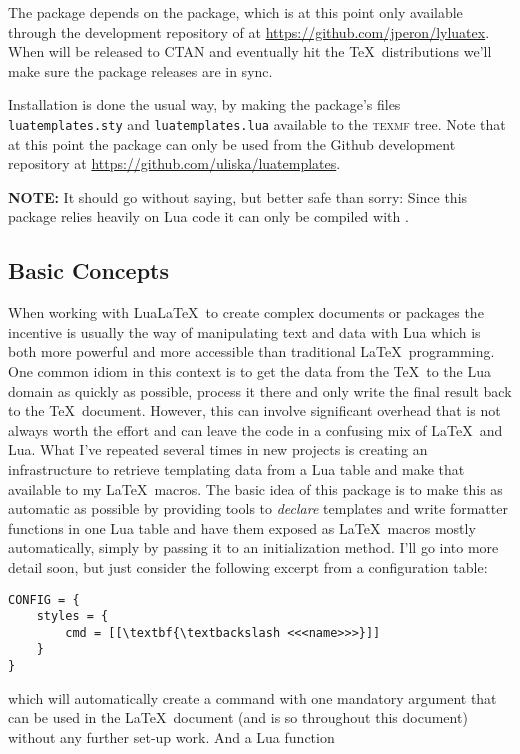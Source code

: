\documentclass{scrartcl}
\begin{document}
The package depends on the  package, which is at this
point only available through the development repository of  at
\url{https://github.com/jperon/lyluatex}.  When  will be
released to CTAN and eventually hit the \TeX\ distributions we'll make sure the
package releases are in sync.

Installation is done the usual way, by making the package's files
\texttt{luatemplates.sty} and \texttt{luatemplates.lua} available to the
\textsc{texmf} tree. Note that at this point the package can only be used from
the Github development repository at
\url{https://github.com/uliska/luatemplates}.

\textbf{NOTE:} It should go without saying, but better safe than sorry: Since
this package relies heavily on Lua code it can only be compiled with
.


\subsection{Basic Concepts}

When working with Lua\LaTeX\ to create complex documents or packages the incentive
is usually the way of manipulating text and data with Lua which is both more
powerful and more accessible than traditional \LaTeX\ programming.  One common
idiom in this context is to get the data from the \TeX\ to the Lua domain as
quickly as possible, process it there and only write the final result back to
the \TeX\ document.  However, this can involve significant overhead that is not
always worth the effort and can leave the code in a confusing mix of \LaTeX\ and
Lua.  What I've repeated several times in new projects is creating an
infrastructure to retrieve templating data from a Lua table and make that
available to my \LaTeX\ macros.  The basic idea of this package is to make this
as automatic as possible by providing tools to \emph{declare} templates and
write formatter functions in one Lua table and have them exposed as \LaTeX\
macros mostly automatically, simply by passing it to an initialization method.
I'll go into more detail soon, but just consider the following excerpt from a
configuration table:

\begin{verbatim}
CONFIG = {
    styles = {
        cmd = [[\textbf{\textbackslash <<<name>>>}]]
    }
}
\end{verbatim}

\noindent which will automatically create a command 
with one mandatory argument that can be used in the \LaTeX\ document (and is so
throughout this document) without any further set-up work.  And a Lua function
\end{document}
